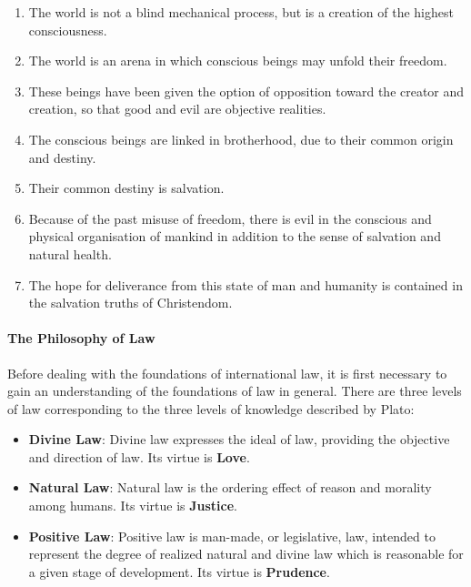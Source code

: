 \begin{enumerate}


\item The world is not a blind mechanical process, but is a creation of the highest consciousness.

\item The world is an arena in which conscious beings may unfold their freedom.

\item These beings have been given the option of opposition toward the creator and creation, so that good and evil are objective realities.

\item The conscious beings are linked in brotherhood, due to their common origin and destiny.

\item Their common destiny is salvation.

\item Because of the past misuse of freedom, there is evil in the conscious and physical organisation of mankind in addition to the sense of salvation and natural health.

\item The hope for deliverance from this state of man and humanity is contained in the salvation truths of Christendom.
\end{enumerate}


\paragraph{The Philosophy of Law}


Before dealing with the foundations of international law, it is first necessary to gain an understanding of the foundations of law in general. There are three levels of law corresponding to the three levels of knowledge described by Plato:

\begin{itemize}


\item \textbf{Divine Law}: Divine law expresses the ideal of law, providing the objective and direction of law. Its virtue is \textbf{Love}.

\item \textbf{Natural Law}: Natural law is the ordering effect of reason and morality among humans. Its virtue is \textbf{Justice}.

\item \textbf{Positive Law}: Positive law is man-made, or legislative, law, intended to represent the degree of realized natural and divine law which is reasonable for a given stage of development. Its virtue is \textbf{Prudence}.

\end{itemize}



